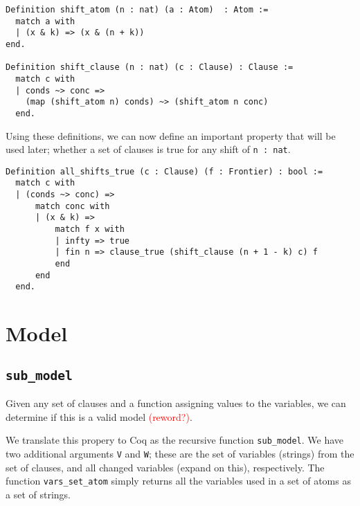 \begin{minipage}{\linewidth}
\begin{lstlisting}[language=Coq, label={lst:shift_atom_clause_true}, caption={Def. of \lstinline{shift_atom} and \lstinline{shift_clause} in Coq}]
Definition shift_atom (n : nat) (a : Atom)  : Atom :=
  match a with
  | (x & k) => (x & (n + k))
end.

Definition shift_clause (n : nat) (c : Clause) : Clause :=
  match c with
  | conds ~> conc =>
    (map (shift_atom n) conds) ~> (shift_atom n conc)
  end.
\end{lstlisting}
\end{minipage}

Using these definitions, we can now define an important property that will be used
later; whether a set of clauses is true for any shift of \lstinline{n : nat}.

\begin{minipage}{\linewidth}
\begin{lstlisting}[language=Coq, label={lst:all_shifts_true}, caption={Def. of \lstinline{all_shifts_true}}]
Definition all_shifts_true (c : Clause) (f : Frontier) : bool :=
  match c with
  | (conds ~> conc) =>
      match conc with
      | (x & k) =>
          match f x with
          | infty => true
          | fin n => clause_true (shift_clause (n + 1 - k) c) f
          end
      end
  end.
\end{lstlisting}
\end{minipage}

\section{Model}

\subsection{\lstinline{sub_model}}

Given any set of clauses and a function assigning values to the variables,
we can determine if this is a valid model \textcolor{red}{(reword?)}.

We translate this propery to Coq as the recursive function \lstinline{sub_model}.
We have two additional arguments \lstinline{V} and \lstinline{W}; these are
the set of variables (strings) from the set of clauses, and all changed variables (expand on this), respectively.
The function \lstinline{vars_set_atom} simply returns all the variables used
in a set of atoms as a set of strings.

